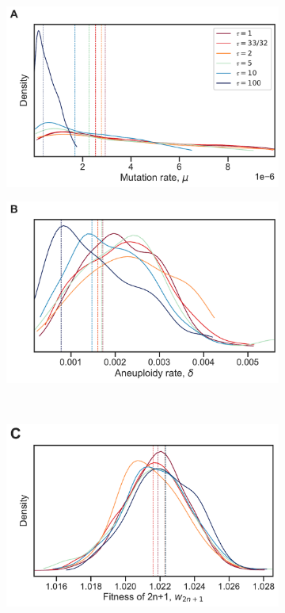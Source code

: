 \documentclass[12pt]{extarticle}
\begin{document}
\begin{figure}[p]
  \centering
  \begin{subfigure}{0.45\textwidth}
      \includegraphics[width=\textwidth]{../figures/tau-A.pdf}      
  \end{subfigure}
  \begin{subfigure}{0.45\textwidth}
      \includegraphics[width=\textwidth]{../figures/tau-B.pdf}      
  \end{subfigure}
  \\
   \begin{subfigure}{0.325\textwidth}
      \includegraphics[width=\textwidth]{../figures/tau-C.pdf}      

\end{subfigure}
\end{figure}
\end{document}
